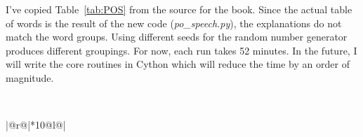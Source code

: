 \documentclass[prelim,showlabels]{book}
\newcommand{\plotsize}{\small}
\begin{document}
I've copied Table~\ref{tab:POS} from the source for the book.  Since
the actual table of words is the result of the new code
(\emph{po\_speech.py}), the explanations do not match the word groups.
Using different seeds for the random number generator produces
different groupings.  For now, each run takes 52 minutes.  In the
future, I will write the core routines in Cython which will reduce the
time by an order of magnitude.
\begin{table}[htb]
  \caption[Words most frequently associated with each state.]%
  {Words most frequently associated with each state.  While I have no
    interpretation for three of the states, some of the following
    interpretations of the other states are strikingly successful.}
  \begin{center}{\plotsize%
      \\[2.0ex]
      \begin{tabular}{|@{\hspace{0.10em}}r@{\hspace{0.40em}}|*{10}{@{\hspace{0.28em}}l@{\hspace{0.28em}}}|}
      \end{tabular}
    }\end{center}
  \label{tab:POS}
\end{table}
\end{document}
